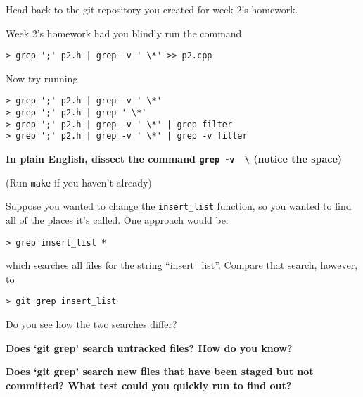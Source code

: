 \documentclass{article}
\begin{document}
\medskip
\noindent
Head back to the git repository you created for week 2's homework.

\medskip
\noindent
Week 2's homework had you blindly run the command
\begin{lstlisting}
> grep ';' p2.h | grep -v ' \*' >> p2.cpp
\end{lstlisting}
%
Now try running
\begin{lstlisting}
> grep ';' p2.h | grep -v ' \*'
> grep ';' p2.h | grep ' \*'
> grep ';' p2.h | grep -v ' \*' | grep filter
> grep ';' p2.h | grep -v ' \*' | grep -v filter
\end{lstlisting}
%
\textbf{In plain English, dissect the command \texttt{grep -v \textquotesingle~\textbackslash*\textquotesingle} (notice the space)}
\vspace{3cm}


\noindent
(Run \texttt{make} if you haven't already)

\medskip
\noindent
Suppose you wanted to change the \texttt{insert\_list} function, so you wanted
to find all of the places it's called. One approach would be:
\begin{lstlisting}
> grep insert_list *
\end{lstlisting}
which searches all files for the string ``insert\_list''. Compare that search,
however, to
\begin{lstlisting}
> git grep insert_list
\end{lstlisting}
Do you see how the two searches differ?

\medskip
\noindent
\textbf{Does `git grep' search untracked files? How do you know?}
\vspace{3cm}


\noindent
\textbf{Does `git grep' search new files that have been staged but not
committed? What test could you quickly run to find out?}
\vspace{3cm}
\end{document}
